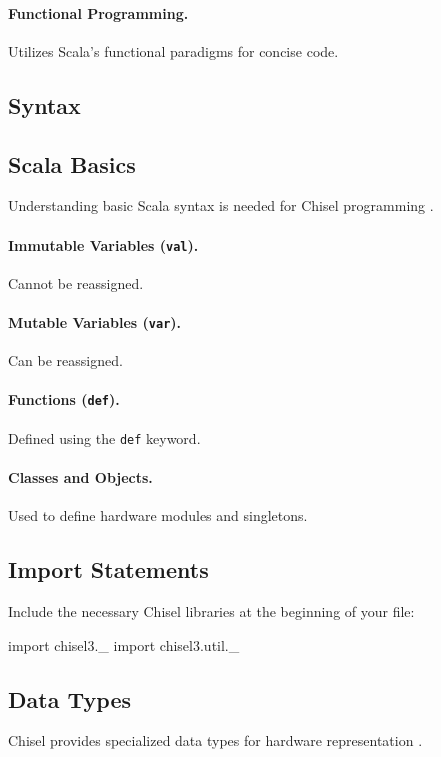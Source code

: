 \paragraph{Functional Programming.} Utilizes Scala's functional paradigms for concise code.


\subsection{Syntax}

\subsection{Scala Basics}
Understanding basic Scala syntax is needed for Chisel programming \cite{odersky2008programming}.

\paragraph{Immutable Variables (\texttt{val}).} Cannot be reassigned.
\paragraph{Mutable Variables (\texttt{var}).} Can be reassigned.
\paragraph{Functions (\texttt{def}).} Defined using the \texttt{def} keyword.
\paragraph{Classes and Objects.} Used to define hardware modules and singletons.

\subsection{Import Statements}
Include the necessary Chisel libraries at the beginning of your file:

\begin{chiselcode}
import chisel3._
import chisel3.util._    
\end{chiselcode}

\subsection{Data Types}
Chisel provides specialized data types for hardware representation \cite{chisel-doc}.

